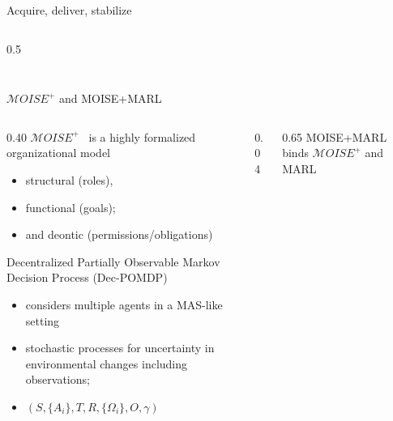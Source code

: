 \documentclass[aspectratio=169]{beamer}
\begin{document}
\begin{frame}{Acquire, deliver, stabilize}
\begin{columns}[c,totalwidth=\textwidth]
\begin{column}{0.5\textwidth}
\begin{tabularx}{\linewidth}{p{3cm}p{.8cm} X}
        \bottomrule
      \end{tabularx}

    \end{column}
    \vspace{-0.5cm}
  \end{columns}

\end{frame}


\begin{frame}{$\mathcal{M}OISE^+$ and MOISE+MARL}

  \vspace{0.3cm}

  \begin{columns}[c,totalwidth=\textwidth]
    \scriptsize
    \hspace{-0.5cm}
    \begin{column}{0.40\textwidth}
      \scriptsize
      $\mathcal{M}OISE^+$~\citep{Hubner2002,Hubner2007} is a highly formalized organizational model
      \begin{itemize}
        \item structural (roles),
        \item functional (goals);
        \item and deontic (permissions/obligations)
      \end{itemize}

      \vspace{0.5cm}

      Decentralized Partially Observable Markov Decision Process (Dec-POMDP) \citep{Oliehoek2016}
      \begin{itemize}
        \item considers multiple agents in a MAS-like setting
        \item stochastic processes for uncertainty in environmental changes including observations;
        \item $(S,\{A_i\},T,R,\{\Omega_i\},O,\gamma)$
      \end{itemize}

    \end{column}

    \begin{column}{0.04\textwidth}
    \end{column}

    \begin{column}{0.65\textwidth}
      \scriptsize
      MOISE+MARL~\citep{soule2024moise_marl} binds $\mathcal{M}OISE^+$ and MARL
      \begin{itemize}
        \setlength{\itemsep}{2pt}
        \setlength{\parskip}{0pt}
        \setlength{\parsep}{0pt}


\end{itemize}
\end{column}
\end{columns}
\end{frame}
\end{document}
